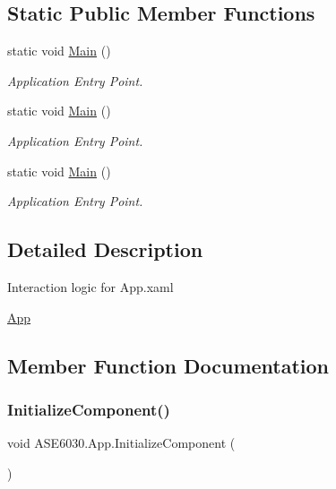 \subsection*{Static Public Member Functions}
\begin{DoxyCompactItemize}
\item 
static void \hyperlink{class_a_s_e6030_1_1_app_abf70d608fded53409f9aff64e8a723b3}{Main} ()
\begin{DoxyCompactList}\small\item\em Application Entry Point. \end{DoxyCompactList}\item 
static void \hyperlink{class_a_s_e6030_1_1_app_abf70d608fded53409f9aff64e8a723b3}{Main} ()
\begin{DoxyCompactList}\small\item\em Application Entry Point. \end{DoxyCompactList}\item 
static void \hyperlink{class_a_s_e6030_1_1_app_abf70d608fded53409f9aff64e8a723b3}{Main} ()
\begin{DoxyCompactList}\small\item\em Application Entry Point. \end{DoxyCompactList}\end{DoxyCompactItemize}


\subsection{Detailed Description}
Interaction logic for App.\+xaml 

\hyperlink{class_a_s_e6030_1_1_app}{App} 

\subsection{Member Function Documentation}
\mbox{\label{class_a_s_e6030_1_1_app_a3e92cf5b5ce00ab4725d8b49d4f4608b}} 
\subsubsection{\texorpdfstring{Initialize\+Component()}{InitializeComponent()}\hspace{0.1cm}{\footnotesize\ttfamily [1/3]}}
{\footnotesize\ttfamily void A\+S\+E6030.\+App.\+Initialize\+Component (\begin{DoxyParamCaption}{ }\end{DoxyParamCaption})\hspace{0.3cm}{\ttfamily [inline]}}



